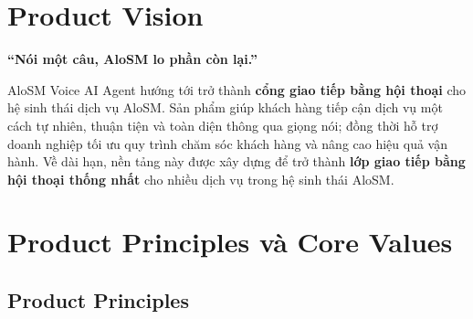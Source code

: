 \documentclass[12pt,a4paper]{article}
\begin{document}
\section{Product Vision}

\begin{tcolorbox}[visionbox]
  \begin{center}
    {\large\bfseries ``Nói một câu, AloSM lo phần còn lại.''}
  \end{center}
  \vspace{0.4em}
  AloSM Voice AI Agent hướng tới trở thành \textbf{cổng giao tiếp bằng hội thoại} cho hệ sinh thái dịch vụ AloSM. Sản phẩm giúp khách hàng tiếp cận dịch vụ một cách tự nhiên, thuận tiện và toàn diện thông qua giọng nói; đồng thời hỗ trợ doanh nghiệp tối ưu quy trình chăm sóc khách hàng và nâng cao hiệu quả vận hành. Về dài hạn, nền tảng này được xây dựng để trở thành \textbf{lớp giao tiếp bằng hội thoại thống nhất} cho nhiều dịch vụ trong hệ sinh thái AloSM.
\end{tcolorbox}

\section{Product Principles và Core Values}

\subsection{Product Principles}
\end{document}
